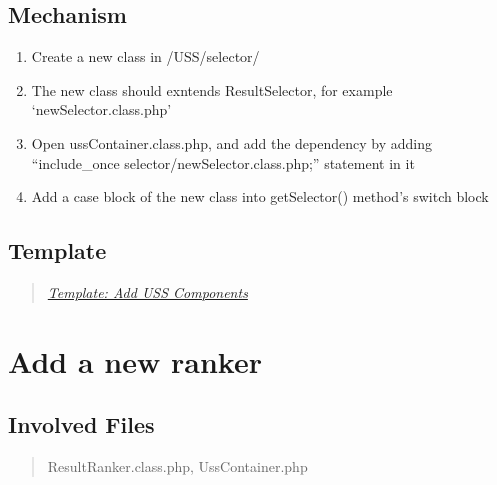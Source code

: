 \documentclass[letterpaper,10pt,english]{sphinxmanual}
\begin{document}
\subsection{Mechanism}
\label{docs/hooks/new_selector:mechanism}\begin{enumerate}
\item {} 
Create a new class in /USS/selector/

\item {} 
The new class should exntends ResultSelector, for example `newSelector.class.php'

\item {} 
Open ussContainer.class.php, and add the dependency by adding ``include\_once selector/newSelector.class.php;'' statement in it

\item {} 
Add a case block of the new class into getSelector() method's switch block

\end{enumerate}


\subsection{Template}
\label{docs/hooks/new_selector:template}\begin{quote}

{\hyperref[docs/hooks/t_uss_components:hook-template-uss]{\emph{Template: Add USS Components}}}
\end{quote}


\section{Add a new ranker}
\label{docs/hooks/new_ranker:add-a-new-ranker}\label{docs/hooks/new_ranker::doc}\label{docs/hooks/new_ranker:hook-ranker}

\subsection{Involved Files}
\label{docs/hooks/new_ranker:involved-files}\begin{quote}

ResultRanker.class.php, UssContainer.php
\end{quote}
\end{document}
